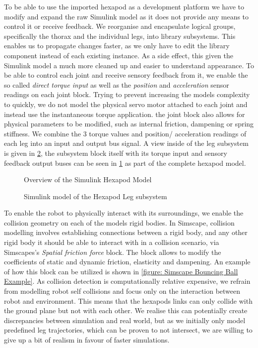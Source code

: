 To be able to use the imported hexapod as a development platform we have to modify and expand the raw Simulink model as it does not provide any means to control it or receive feedback.
We reorganise and encapsulate logical groups, specifically the thorax and the individual legs, into library subsystems.
This enables us to propagate changes faster, as we only have to edit the library component instead of each existing instance.
As a side effect, this given the Simulink model a much more cleaned up and easier to understand appearance.
To be able to control each joint and receive sensory feedback from it, we enable the so called \textit{direct torque input} as well as the \textit{position} and \textit{acceleration} sensor readings on each joint block.
Trying to prevent increasing the models complexity to quickly, we do not model the physical servo motor attached to each joint and instead use the instantaneous torque application.
the joint block also allows for physical parameters to be modified, such as internal friction, dampening or spring stiffness.
We combine the 3 torque values and position/ acceleration readings of each leg into an input and output bus signal.
A view inside of the leg subsystem is given in \ref{figure: Hexapod Leg}, the subsystem block itself with its torque input and sensory feedback output buses can be seen in \ref{figure: Hexapod Model Overview} as part of the complete hexapod model.

\begin{figure}[h]
	\centerline{}
	\caption{Overview of the Simulink Hexapod Model}
	\label{figure: Hexapod Model Overview}
\end{figure}

\begin{figure}
	\centerline{}
	\caption{Simulink model of the Hexapod Leg subsystem}
	\label{figure: Hexapod Leg}
\end{figure}

To enable the robot to physically interact with its surroundings, we enable the collision geometry on each of the models rigid bodies.
In Simscape, collision modelling involves establishing connections between a rigid body, and any other rigid body it should be able to interact with in a collision scenario, via Simscapes's \textit{Spatial friction force} block.
The block allows to modify the coefficients of static and dynamic friction, elasticity and dampening.
An example of how this block can be utilized is shown in \ref{figure: Simscape Bouncing Ball Example}.
As collision detection is computationally relative expensive, we refrain from modelling robot self collisions and focus only on the interaction between robot and environment.
This means that the hexapods links can only collide with the ground plane but not with each other.
We realise this can potentially create discrepancies between simulation and real world, but as we initially only model predefined leg trajectories, which can be proven to not intersect, we are willing to give up a bit of realism in favour of faster simulations.

